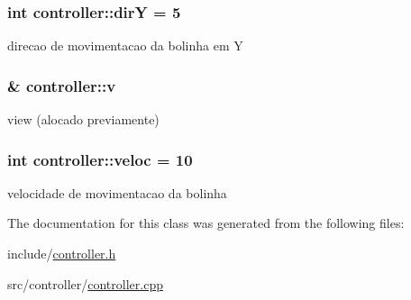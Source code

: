 \subsubsection[{\texorpdfstring{dirY}{dirY}}]{\setlength{\rightskip}{0pt plus 5cm}int controller\+::dirY = 5\hspace{0.3cm}{\ttfamily [private]}}\hypertarget{classcontroller_a136888a5f98296f5266a01330e2881e7}{}\label{classcontroller_a136888a5f98296f5266a01330e2881e7}
direcao de movimentacao da bolinha em Y 
\subsubsection[{\texorpdfstring{v}{v}}]{\& controller\+::v\hspace{0.3cm}{\ttfamily [private]}}\hypertarget{classcontroller_a6ff845413a797ed4beff34d3cb6b7774}{}\label{classcontroller_a6ff845413a797ed4beff34d3cb6b7774}
view (alocado previamente) 
\subsubsection[{\texorpdfstring{veloc}{veloc}}]{\setlength{\rightskip}{0pt plus 5cm}int controller\+::veloc = 10\hspace{0.3cm}{\ttfamily [private]}}\hypertarget{classcontroller_ae1229353be5404b8decda1e8775292c4}{}\label{classcontroller_ae1229353be5404b8decda1e8775292c4}
velocidade de movimentacao da bolinha 

The documentation for this class was generated from the following files\+:\begin{DoxyCompactItemize}
\item 
include/\hyperlink{controller_8h}{controller.\+h}\item 
src/controller/\hyperlink{controller_8cpp}{controller.\+cpp}\end{DoxyCompactItemize}
